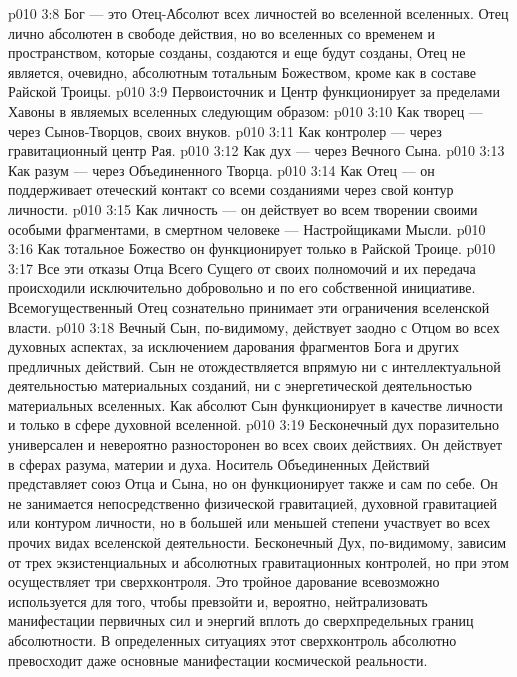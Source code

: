 \vs p010 3:8 Бог --- это Отец\hyp{}Абсолют всех личностей во вселенной вселенных. Отец лично абсолютен в свободе действия, но во вселенных со временем и пространством, которые созданы, создаются и еще будут созданы, Отец не является, очевидно, абсолютным тотальным Божеством, кроме как в составе Райской Троицы.
\vs p010 3:9 \pc Первоисточник и Центр функционирует за пределами Хавоны в являемых вселенных следующим образом:
\vs p010 3:10 \bibnobreakspace Как творец --- через Сынов\hyp{}Творцов, своих внуков.
\vs p010 3:11 \bibnobreakspace Как контролер --- через гравитационный центр Рая.
\vs p010 3:12 \bibnobreakspace Как дух --- через Вечного Сына.
\vs p010 3:13 \bibnobreakspace Как разум --- через Объединенного Творца.
\vs p010 3:14 \bibnobreakspace Как Отец --- он поддерживает отеческий контакт со всеми созданиями через свой контур личности.
\vs p010 3:15 \bibnobreakspace Как личность --- он действует  во всем творении своими особыми фрагментами, в смертном человеке --- Настройщиками Мысли.
\vs p010 3:16 \bibnobreakspace Как тотальное Божество он функционирует только в Райской Троице.
\vs p010 3:17 \pc Все эти отказы Отца Всего Сущего от своих полномочий и их передача происходили исключительно добровольно и по его собственной инициативе. Всемогущественный Отец сознательно принимает эти ограничения вселенской власти.
\vs p010 3:18 \pc Вечный Сын, по\hyp{}видимому, действует заодно с Отцом во всех духовных аспектах, за исключением дарования фрагментов Бога и других предличных действий. Сын не отождествляется впрямую ни с интеллектуальной деятельностью материальных созданий, ни с энергетической деятельностью материальных вселенных. Как абсолют Сын функционирует в качестве личности и только в сфере духовной вселенной.
\vs p010 3:19 \pc Бесконечный дух поразительно универсален и невероятно разносторонен во всех своих действиях. Он действует в сферах разума, материи и духа. Носитель Объединенных Действий представляет союз Отца и Сына, но он функционирует также и сам по себе. Он не занимается непосредственно физической гравитацией, духовной гравитацией или контуром личности, но в большей или меньшей степени участвует во всех прочих видах вселенской деятельности. Бесконечный Дух, по\hyp{}видимому, зависим от трех экзистенциальных и абсолютных гравитационных контролей, но при этом осуществляет три сверхконтроля. Это тройное дарование всевозможно используется для того, чтобы превзойти и, вероятно, нейтрализовать манифестации первичных сил и энергий вплоть до сверхпредельных границ абсолютности. В определенных ситуациях этот сверхконтроль абсолютно превосходит даже основные манифестации космической реальности.
